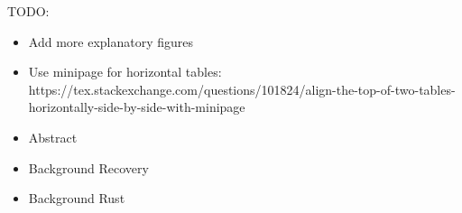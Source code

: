 \color{purple}
TODO:
\begin{itemize}
  \item Add more explanatory figures
  \item Use minipage for horizontal tables: https://tex.stackexchange.com/questions/101824/align-the-top-of-two-tables-horizontally-side-by-side-with-minipage

  \item Abstract

  \item Background Recovery
  \item Background Rust
\end{itemize}

